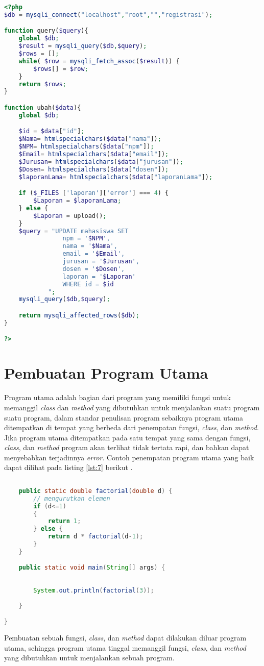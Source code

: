 \begin{lstlisting}[language=PHP, caption=Contoh standar pembuatan fungsi,label={lst:6}]
<?php 
$db = mysqli_connect("localhost","root","","registrasi");

function query($query){
	global $db;
	$result = mysqli_query($db,$query);
	$rows = [];
	while( $row = mysqli_fetch_assoc($result)) {
		$rows[] = $row; 
	}
	return $rows;
}

function ubah($data){
	global $db;

	$id = $data["id"];
	$Nama= htmlspecialchars($data["nama"]);
	$NPM= htmlspecialchars($data["npm"]);
	$Email= htmlspecialchars($data["email"]);
	$Jurusan= htmlspecialchars($data["jurusan"]); 
	$Dosen= htmlspecialchars($data["dosen"]);
	$laporanLama= htmlspecialchars($data["laporanLama"]);

	if ($_FILES ['laporan']['error'] === 4) {
		$Laporan = $laporanLama;
	} else {
		$Laporan = upload();
	}
	$query = "UPDATE mahasiswa SET 
				npm = '$NPM',
				nama = '$Nama',
				email = '$Email',
				jurusan = '$Jurusan',
				dosen = '$Dosen',
				laporan = '$Laporan' 
				WHERE id = $id
			";
	mysqli_query($db,$query);

	return mysqli_affected_rows($db);
}

?>
\end{lstlisting}

\section{Pembuatan Program Utama}
\par 
Program utama adalah bagian dari program yang memiliki fungsi untuk memanggil \textit{class} dan \textit{method} yang dibutuhkan untuk menjalankan suatu program suatu program, dalam standar penulisan program sebaiknya program utama ditempatkan di tempat yang berbeda dari penempatan  fungsi, \textit{class}, dan \textit{method}. Jika program utama ditempatkan pada satu tempat yang sama dengan fungsi, \textit{class}, dan \textit{method} program akan terlihat tidak tertata rapi, dan bahkan dapat menyebabkan terjadinnya \textit{error}. Contoh penempatan program utama yang baik dapat dilihat pada listing \ref{lst:7} berikut .

\begin{lstlisting}[language=Java, caption=Contoh pembuatan program utama,label={lst:7}]
	
	public static double factorial(double d) {
		// mengurutkan elemen
		if (d<=1)
		{
			return 1;
		} else {
			return d * factorial(d-1);
		}
	}

	public static void main(String[] args) {
	
		
		System.out.println(factorial(3));
		
	}

}
\end{lstlisting}
\par 
Pembuatan sebuah fungsi, \textit{class}, dan \textit{method} dapat dilakukan diluar program utama, sehingga program utama tinggal memanggil fungsi, \textit{class}, dan \textit{method} yang dibutuhkan untuk menjalankan sebuah program.



